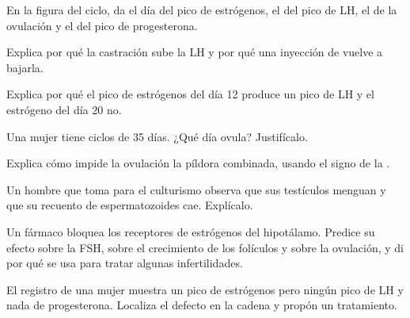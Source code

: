 \begin{exercise}[$\star\star$]\label{exo:g11:hormones-and-reproduction:6}
En la figura del ciclo, da el día del pico de estrógenos, el del pico
de LH, el de la ovulación y el del pico de progesterona.
\end{exercise}

\begin{exercise}[$\star\star$]\label{exo:g11:hormones-and-reproduction:7}
Explica por qué la castración sube la LH y por qué una inyección de
 vuelve a bajarla.
\end{exercise}

\begin{exercise}[$\star\star$]\label{exo:g11:hormones-and-reproduction:8}
Explica por qué el pico de estrógenos del día 12 produce un pico de LH
y el estrógeno del día 20 no.
\end{exercise}

\begin{exercise}[$\star\star$]\label{exo:g11:hormones-and-reproduction:9}
Una mujer tiene ciclos de 35 días. ¿Qué día ovula? Justifícalo.
\end{exercise}

\begin{exercise}[$\star\star$]\label{exo:g11:hormones-and-reproduction:10}
Explica cómo impide la ovulación la píldora combinada, usando el signo
de la .
\end{exercise}

\begin{exercise}[$\star\star$]\label{exo:g11:hormones-and-reproduction:11}
Un hombre que toma  para el culturismo observa que sus
testículos menguan y que su recuento de espermatozoides cae.
Explícalo.
\end{exercise}

\begin{exercise}[$\star\star\star$]\label{exo:g11:hormones-and-reproduction:12}
Un fármaco bloquea los receptores de estrógenos del hipotálamo. Predice
su efecto sobre la FSH, sobre el crecimiento de los folículos y sobre
la ovulación, y di por qué se usa para tratar algunas infertilidades.
\end{exercise}

\begin{exercise}[$\star\star\star$]\label{exo:g11:hormones-and-reproduction:13}
El registro de una mujer muestra un pico de estrógenos pero ningún pico
de LH y nada de progesterona. Localiza el defecto en la cadena y propón
un tratamiento.
\end{exercise}

